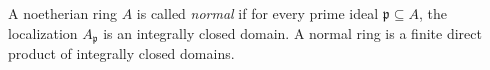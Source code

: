 A noetherian ring $A$ is called \emph{normal} if for every prime ideal $\mathfrak{p} \subseteq A$, the localization $A_\mathfrak{p}$ is an integrally closed domain. A normal ring is a finite direct product of integrally closed domains.
